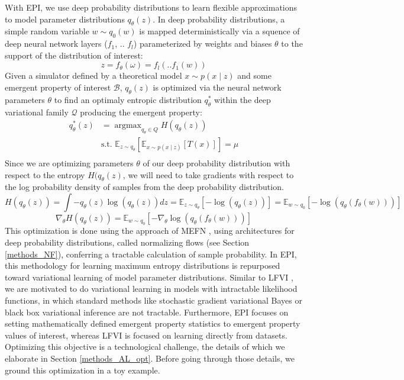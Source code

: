\documentclass[11pt]{article}
\DeclareMathOperator*{\argmax}{argmax}
\begin{document}
With EPI, we use deep probability distributions to learn flexible approximations to model parameter distributions $q_\theta(z)$.
 In deep probability distributions, a simple random variable $w \sim q_0(w)$ is mapped deterministically via a squence of deep neural network layers ($f_1$, .. $f_l$) parameterized by weights and biases $\theta$ to the support of the distribution of interest:
\begin{equation}
z = f_{\theta}(\omega) = f_l(..f_1(w))
\end{equation}
Given a simulator defined by a theoretical model $x \sim p(x \mid z)$ and some emergent property of interest $\mathcal{B}$, $q_\theta(z)$ is optimized via the neural network parameters $\theta$ to find an optimaly entropic distribution $q_{\theta}^*$ within the deep variational family $\mathcal{Q}$ producing the emergent property:
\begin{equation} \label{eq:opt}
\begin{split}
q_\theta^*(z) &= \argmax_{q_\theta \in Q} H(q_\theta(z)) \\
 &  \text{s.t.  } \mathbb{E}_{z \sim q_\theta}\left[ \mathbb{E}_{x\sim p(x \mid z)}\left[T(x)\right] \right] = \mu \\
 \end{split}
\end{equation} 
Since we are optimizing parameters $\theta$ of our deep probability distribution with respect to the entropy $H(q_\theta(z)$, we will need to take gradients with respect to the log probability density of samples from the deep probability distribution.
\begin{equation}
H(q_\theta(z)) = \int - q_\theta(z) \log(q_\theta(z)) dz = \mathbb{E}_{z \sim q_\theta}\left[-\log(q_\theta(z)) \right] = \mathbb{E}_{w \sim q_0}\left[-\log(q_\theta(f_\theta(w))) \right]
\end{equation}
\begin{equation}
\nabla_\theta H(q_\theta(z)) = \mathbb{E}_{w \sim q_0}\left[- \nabla_\theta \log(q_\theta(f_\theta(w))) \right]
\end{equation}
This optimization is done using the approach of MEFN \cite{loaiza2017maximum}, using architectures for deep probability distributions, called normalizing flows (see Section \ref{methods_NF}), conferring a tractable calculation of sample probability.  In EPI, this methodology for learning maximum entropy distributions is repurposed toward variational learning of model parameter distributions.  
Similar to LFVI \cite{tran2017hierarchical}, we are motivated to do variational learning in models with intractable likelihood functions, in which standard methods like stochastic gradient variational Bayes \cite{kingma2013auto} or black box variational inference\cite{ranganath2014black} are not tractable.  Furthermore, EPI focuses on setting mathematically defined emergent property statistics to emergent property values of interest, whereas LFVI is focused on learning directly from datasets.  Optimizing this objective is a technological challenge, the details of which we elaborate in Section \ref{methods_AL_opt}.  Before going through those details, we ground this optimization in a toy example.
\end{document}
